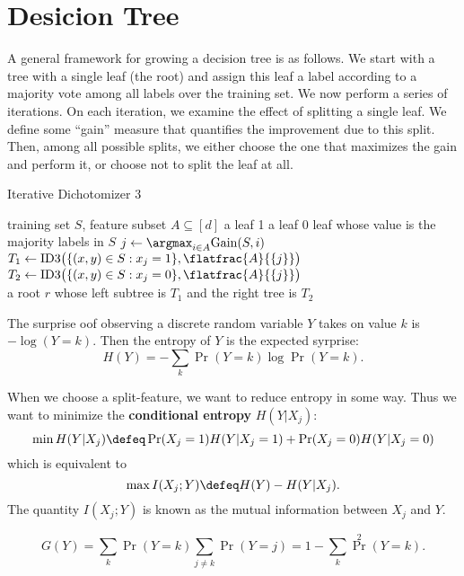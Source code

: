 \section{Desicion Tree}

A general framework for growing a decision tree is as follows. We start with a tree with a single leaf (the root) and assign this leaf a label according to a majority vote among all labels over the training set. We now perform a series of iterations. On each iteration, we examine the effect of splitting a single leaf. We define some “gain” measure that quantifies the improvement due to this split. Then, among all possible splits, we either choose the one that maximizes the gain and perform it, or choose not to split the leaf at all.

\begin{algorithm}[htbp]
	\caption{Iterative Dichotomizer 3}
	\label{ID3}
	\begin{algorithmic}[1]
		\renewcommand{\algorithmicrequire}{\textbf{Input:}}
		\renewcommand{\algorithmicensure}{\textbf{Output:}}
		\renewcommand{\algorithmiccomment}[1]{\hfill\textit{\textcolor{blue}{\##1}}}
		\REQUIRE training set $S$, feature subset $A\subseteq[d]$
		\RETURN a leaf 1
		\RETURN a leaf 0
		\RETURN leaf whose value is the majority labels in $S$
		\ENDIF
		\STATE $j\gets \argmax_{i\in A}\mathrm{Gain}(S,i)$\\[2pt]
		\STATE $T_1\gets \mathrm{ID3}\big(\{(x,y)\in S:x_j=1\},\flatfrac{A}{\{j\}}\big)$\\[2pt]
		\STATE $T_2\gets \mathrm{ID3}\big(\{(x,y)\in S:x_j=0\},\flatfrac{A}{\{j\}}\big)$\\[2pt]
		\RETURN a root $r$ whose left subtree is  $T_1$ and the right tree is $T_2$
	\end{algorithmic} 
\end{algorithm}

\begin{defi}[Entropy]
	The surprise oof observing a discrete random variable $Y$ takes on value  $k$ is $-\log(Y=k)$. Then the entropy of  $Y$ is the expected syrprise:
	 \[
	    H(Y)=-\sum_k \Pr(Y=k)\log \Pr(Y=k)
	.\] 
\end{defi}

When we choose a split-feature, we want to reduce entropy in some way. Thus we want to minimize the \textbf{conditional entropy} $H(Y|X_j)$:
 \[
    \min H(Y|X_j)\defeq
	\Pr(X_j=1)H(Y|X_j=1)+\Pr(X_j=0)H(Y|X_j=0)
\] which is equivalent to
\[
    \max I(X_j;Y)
	\defeq
	H(Y)-H(Y|X_j)
.\]
The quantity $I(X_j;Y)$ is known as the mutual information between  $X_j$ and $Y$.
\begin{defi}
	\[
		G(Y)=\sum_k \Pr(Y=k)\sum_{j\ne k}\Pr(Y=j)=1-\sum_k\Pr^2(Y=k)
	.\]
\end{defi}

